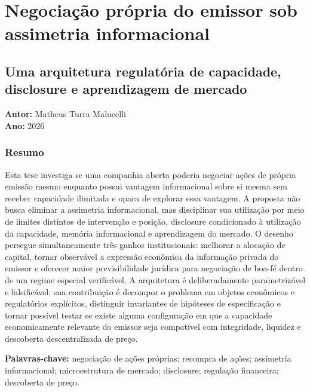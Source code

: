 \documentclass[
  a4paper,
]{article}
\author{Matheus Turra Malucelli}
\date{2026}
\begin{document}
\hypertarget{negociauxe7uxe3o-pruxf3pria-do-emissor-sob-assimetria-informacional}{%
\section{Negociação própria do emissor sob assimetria
informacional}\label{negociauxe7uxe3o-pruxf3pria-do-emissor-sob-assimetria-informacional}}

\hypertarget{uma-arquitetura-regulatuxf3ria-de-capacidade-disclosure-e-aprendizagem-de-mercado}{%
\subsection{Uma arquitetura regulatória de capacidade, disclosure e
aprendizagem de
mercado}\label{uma-arquitetura-regulatuxf3ria-de-capacidade-disclosure-e-aprendizagem-de-mercado}}

\textbf{Autor:} Matheus Turra Malucelli\\
\textbf{Ano:} 2026

\hypertarget{resumo}{%
\subsubsection{Resumo}\label{resumo}}

Esta tese investiga se uma companhia aberta poderia negociar ações de
própria emissão mesmo enquanto possui vantagem informacional sobre si
mesma sem receber capacidade ilimitada e opaca de explorar essa
vantagem. A proposta não busca eliminar a assimetria informacional, mas
disciplinar sua utilização por meio de limites distintos de intervenção
e posição, disclosure condicionado à utilização da capacidade, memória
informacional e aprendizagem do mercado. O desenho persegue
simultaneamente três ganhos institucionais: melhorar a alocação de
capital, tornar observável a expressão econômica da informação privada
do emissor e oferecer maior previsibilidade jurídica para negociação de
boa-fé dentro de um regime especial verificável. A arquitetura é
deliberadamente parametrizável e falsificável: sua contribuição é
decompor o problema em objetos econômicos e regulatórios explícitos,
distinguir invariantes de hipóteses de especificação e tornar possível
testar se existe alguma configuração em que a capacidade economicamente
relevante do emissor seja compatível com integridade, liquidez e
descoberta descentralizada de preço.

\textbf{Palavras-chave:} negociação de ações próprias; recompra de
ações; assimetria informacional; microestrutura de mercado; disclosure;
regulação financeira; descoberta de preço.
\end{document}
